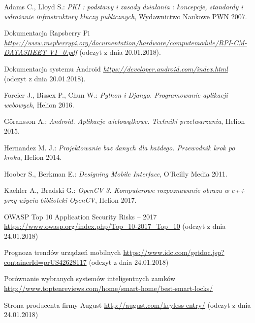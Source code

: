 \documentclass[twoside,10pt]{article}
\begin{document}
\newpage
\begin{thebibliography}{99}
Adams C., Lloyd S.: 
\textit{PKI : podstawy i zasady działania : koncepcje, standardy i wdrażanie infrastruktury kluczy publicznych}, Wydawnictwo Naukowe PWN 2007.

Dokumentacja Rapsberry Pi \\
\textit{ \href {https://www.raspberrypi.org/documentation/hardware/computemodule/RPI-CM-DATASHEET-V1_0.pdf} {https://www.raspberrypi.org/documentation/hardware/computemodule/RPI-CM-DATASHEET-V1\_0.pdf} }(odczyt z dnia 20.01.2018).

Dokumentacja systemu Android
\textit{ \href {https://developer.android.com/index.html} {https://developer.android.com/index.html} }(odczyt z dnia 20.01.2018).

Forcier J., Bissex P., Chun W.:
\textit{Python i Django. Programowanie aplikacji webowych}, 
Helion 2016.

Göransson A.: 
\textit{Android. Aplikacje wielowątkowe. Techniki przetwarzania}, 
Helion 2015. 

Hernandez M. J.: 
\textit{Projektowanie baz danych dla każdego. Przewodnik krok po kroku}, 
Helion 2014.

Hoober S., Berkman E.: 
\textit{Designing Mobile Interface}, 
O'Reilly Media 2011.

Kaehler A., Bradski G.: 
\textit{OpenCV 3. Komputerowe rozpoznawanie obrazu w c++ przy użyciu biblioteki OpenCV}, Helion 2017.

OWASP Top 10 Application Security Risks -- 2017\\
\href{https://www.owasp.org/index.php/Top_10-2017_Top_10}{https://www.owasp.org/index.php/Top\_10-2017\_Top\_10} (odczyt z dnia 24.01.2018)

Prognoza trendów urządzeń mobilnych
\href{https://www.idc.com/getdoc.jsp?containerId=prUS42628117}{https://www.idc.com/getdoc.jsp?containerId=prUS42628117} (odczyt z dnia 24.01.2018)

Porównanie wybranych systemów inteligentnych zamków \href{http://www.toptenreviews.com/home/smart-home/best-smart-locks/}{http://www.toptenreviews.com/home/smart-home/best-smart-locks/}

Strona producenta firmy August \href{http://august.com/keyless-entry/}{http://august.com/keyless-entry/} (odczyt z dnia 24.01.2018)


\end{thebibliography}
\end{document}
